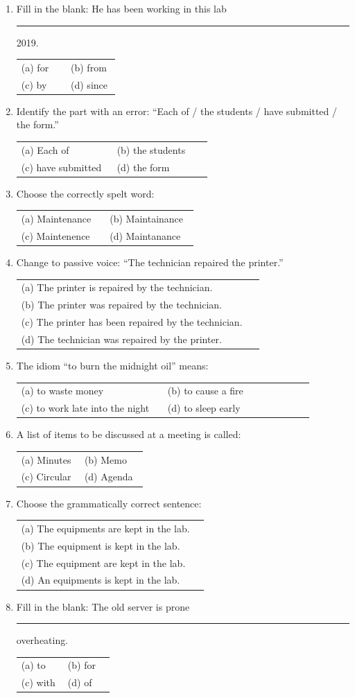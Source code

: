 \documentclass[11pt,a4paper]{article}
\makeatletter
\newcommand{\opts}[4]{\par\nopagebreak\vspace{2pt}%
\begin{tabular}{@{}p{0.47\linewidth}p{0.47\linewidth}@{}}
(a) #1 & (b) #2\\ (c) #3 & (d) #4\end{tabular}}
\newcommand{\optl}[4]{\par\nopagebreak\vspace{2pt}%
\begin{tabular}{@{}p{0.95\linewidth}@{}}
(a) #1\\ (b) #2\\ (c) #3\\ (d) #4\end{tabular}}
\makeatother
\begin{document}
\begin{enumerate}
\item Fill in the blank: He has been working in this lab \rule{1.2cm}{0.4pt} 2019.
\opts{for}{from}{by}{since}
\item Identify the part with an error: ``Each of / the students / have submitted / the form.''
\opts{Each of}{the students}{have submitted}{the form}
\item Choose the correctly spelt word:
\opts{Maintenance}{Maintainance}{Maintenence}{Maintanance}
\item Change to passive voice: ``The technician repaired the printer.''
\optl{The printer is repaired by the technician.}{The printer was repaired by the technician.}{The printer has been repaired by the technician.}{The technician was repaired by the printer.}
\item The idiom ``to burn the midnight oil'' means:
\opts{to waste money}{to cause a fire}{to work late into the night}{to sleep early}
\item A list of items to be discussed at a meeting is called:
\opts{Minutes}{Memo}{Circular}{Agenda}
\item Choose the grammatically correct sentence:
\optl{The equipments are kept in the lab.}{The equipment is kept in the lab.}{The equipment are kept in the lab.}{An equipments is kept in the lab.}
\item Fill in the blank: The old server is prone \rule{1.2cm}{0.4pt} overheating.
\opts{to}{for}{with}{of}
\end{enumerate}
\end{document}
